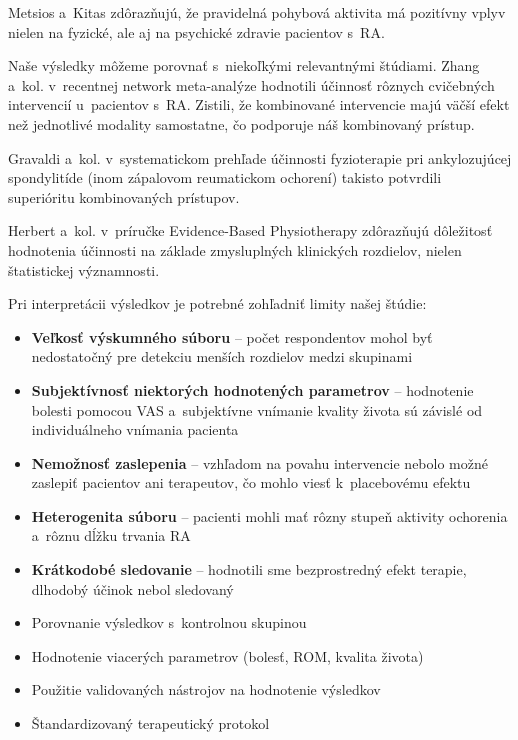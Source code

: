 Metsios a~Kitas \parencite*{metsios2020} zdôrazňujú, že pravidelná pohybová aktivita má pozitívny vplyv nielen na fyzické, ale aj na psychické zdravie pacientov s~RA.


Naše výsledky môžeme porovnať s~niekoľkými relevantnými štúdiami. Zhang a~kol. \parencite*{Zhang2025} v~recentnej network meta-analýze hodnotili účinnosť rôznych cvičebných intervencií u~pacientov s~RA. Zistili, že kombinované intervencie majú väčší efekt než jednotlivé modality samostatne, čo podporuje náš kombinovaný prístup.

Gravaldi a~kol. \parencite*{Gravaldi2022} v~systematickom prehľade účinnosti fyzioterapie pri ankylozujúcej spondylitíde (inom zápalovom reumatickom ochorení) takisto potvrdili superióritu kombinovaných prístupov.

Herbert a~kol. \parencite*{Herbert2022} v~príručke Evidence-Based Physiotherapy zdôrazňujú dôležitosť hodnotenia účinnosti na základe zmysluplných klinických rozdielov, nielen štatistickej významnosti.

Pri interpretácii výsledkov je potrebné zohľadniť limity našej štúdie:

\begin{itemize}
    \item \textbf{Veľkosť výskumného súboru} -- počet respondentov mohol byť nedostatočný pre detekciu menších rozdielov medzi skupinami
    
    \item \textbf{Subjektívnosť niektorých hodnotených parametrov} -- hodnotenie bolesti pomocou VAS a~subjektívne vnímanie kvality života sú závislé od individuálneho vnímania pacienta
    
    \item \textbf{Nemožnosť zaslepenia} -- vzhľadom na povahu intervencie nebolo možné zaslepiť pacientov ani terapeutov, čo mohlo viesť k~placebovému efektu
    
    \item \textbf{Heterogenita súboru} -- pacienti mohli mať rôzny stupeň aktivity ochorenia a~rôznu dĺžku trvania RA
    
    \item \textbf{Krátkodobé sledovanie} -- hodnotili sme bezprostredný efekt terapie, dlhodobý účinok nebol sledovaný
\end{itemize}

\begin{itemize}
    \item Porovnanie výsledkov s~kontrolnou skupinou
    \item Hodnotenie viacerých parametrov (bolesť, ROM, kvalita života)
    \item Použitie validovaných nástrojov na hodnotenie výsledkov
    \item Štandardizovaný terapeutický protokol
\end{itemize}

